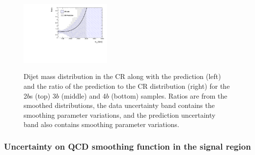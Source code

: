 \begin{figure}[htbp!]
\begin{center}
\includegraphics[angle=270, width=0.4\textwidth]{figures/boosted/Syst_Shape/QCDSysfitSmooth_ratio_44.pdf} \\
\caption{Dijet mass distribution in the CR along with the prediction (left) and the ratio of the prediction to the CR distribution (right)  for the 2$b$s (top) 3$b$ (middle) and 4$b$ (bottom) samples.  Ratios are from the smoothed distributions, the data uncertainty band contains the smoothing parameter variations, and the prediction uncertainty band also contains smoothing parameter variations.}
\label{fig:qcd_shape_fit}
\end{center}
\end{figure}



\clearpage
\subsubsection{Uncertainty on QCD smoothing function in the signal region}
\label{unc-smooth-qcd-in-sr}

